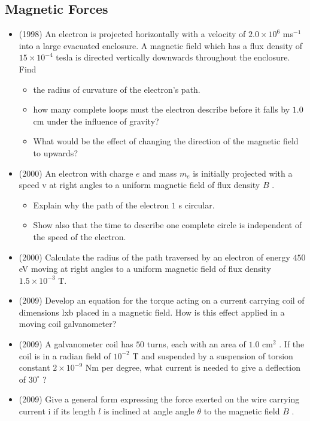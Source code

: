 \documentclass{article}
\begin{document}
\subsection{Magnetic Forces}
\begin{itemize}
\item (1998)  An electron is projected horizontally with a velocity of $ 2.0 \times 10^{6}$ ms$ ^{-1}$ into a large evacuated enclosure. A magnetic field which has a flux density of $ 15 \times 10^{-4}$ tesla is directed vertically downwards throughout the enclosure. Find
 \begin{itemize}
\item the radius of curvature of the electron's path.
\item how many complete loops must the electron describe before it falls by $ 1.0$ cm under the influence of gravity?
\item What would be the effect of changing the direction of the magnetic field to upwards?
\end{itemize}
\item (2000)  An electron with charge $ e$ and mass $ m_{e}$ is initially projected with a speed v at right angles to a uniform magnetic field of flux density $ B$ .
 \begin{itemize}
\item Explain why the path of the electron $ 1$ s circular.
\item Show also that the time to describe one complete circle is independent of the speed of the electron.
\end{itemize}
\item (2000)  Calculate the radius of the path traversed by an electron of energy $ 450$ eV moving at right angles to a uniform magnetic field of flux density $ 1.5\times 10^{-3}$ T.
\item (2009)  Develop an equation for the torque acting on a current carrying coil of dimensions lxb placed in a magnetic field.  How is this effect applied in a moving coil galvanometer?
\item (2009)  A galvanometer coil has $ 50$ turns, each with an area of $ 1.0 $ cm$ ^{2}$ .  If the coil is in a radian field of $ 10^{-2}$ T and suspended by a suspension of torsion constant $ 2 \times 10^{-9}$ Nm per degree, what current is needed to give a deflection of $ 30^{\circ}$ ?
\item (2009)  Give a general form expressing the force exerted on the wire carrying current i if its length $ l$ is inclined at angle angle $ \theta $ to the magnetic field $ B$ .  

\end{itemize}
\end{document}
